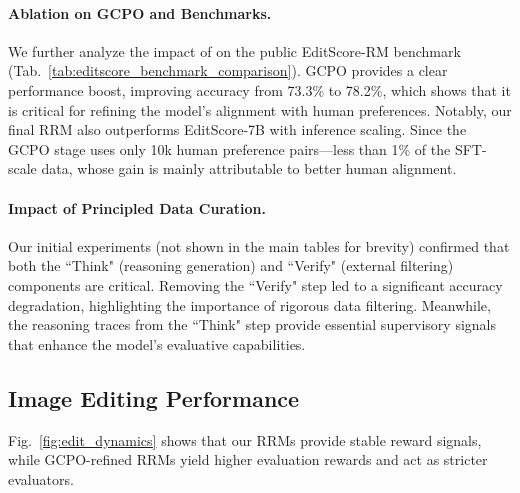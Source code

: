 \paragraph{Ablation on GCPO and Benchmarks.} 
We further analyze the impact of \gcpo{} on the public EditScore-RM benchmark (Tab.~\ref{tab:editscore_benchmark_comparison}). GCPO provides a clear performance boost, improving accuracy from 73.3\% to 78.2\%, which shows that it is critical for refining the model's alignment with human preferences. Notably, our final RRM also outperforms EditScore-7B with inference scaling. Since the GCPO stage uses only 10k human preference pairs---less than 1\% of the SFT-scale data, whose gain is mainly attributable to better human alignment.
\paragraph{Impact of Principled Data Curation.}
Our initial experiments (not shown in the main tables for brevity) confirmed that both the ``Think" (reasoning generation) and ``Verify" (external filtering) components are critical. Removing the ``Verify" step led to a significant accuracy degradation, highlighting the importance of rigorous data filtering. Meanwhile, the reasoning traces from the ``Think" step provide essential supervisory signals that enhance the model's evaluative capabilities.
\vspace{-.6em}
\subsection{Image Editing Performance}
Fig.~\ref{fig:edit_dynamics} shows that our RRMs provide stable reward signals, while GCPO-refined RRMs yield higher evaluation rewards and act as stricter evaluators.
\vspace{-.5em}
